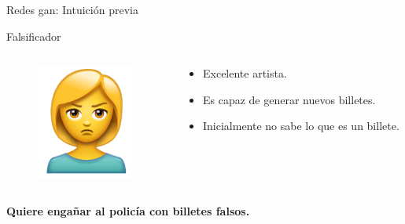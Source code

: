 \begin{frame}{Redes \gls{gan}: Intuición previa}

    {\Large Falsificador}
    \hfill
    
    \begin{columns}[T]
    \begin{column}{.3\textwidth}
    
    \begin{figure}
        \centering
        \includegraphics[width=\textwidth]{Slides/figures/GAN/Falsificador.PNG}
    \end{figure}
    
    \end{column}
    \hfill
    \begin{column}{.68\textwidth}
    
    \begin{itemize}
        \item Excelente artista.
        \item Es capaz de \alert{generar nuevos} billetes.
        \item Inicialmente \alert{no sabe} lo que es un billete.
    \end{itemize}

    \end{column}
    \end{columns}
    
    \vfill
    \centering
    \textbf{\Large Quiere \alert{engañar} al policía con billetes \alert{falsos}.}
    
\end{frame}

